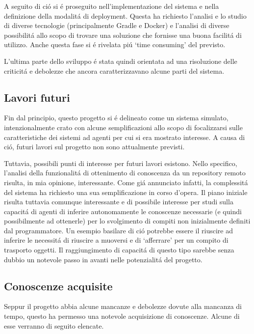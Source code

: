 A seguito di ci\'o si \'e proseguito nell'implementazione del sistema e nella definizione della modalit\'a di deployment. Questa ha richiesto l'analisi e lo studio di diverse tecnologie (principalmente Gradle e Docker) e l'analisi di diverse possibilit\'a allo scopo di trovare una soluzione che fornisse una buona facilit\'a di utilizzo. Anche questa fase si \'e rivelata pi\'u `time consuming' del previsto.

L'ultima parte dello sviluppo \'e stata quindi orientata ad una risoluzione delle criticit\'a e debolezze che ancora caratterizzavano alcune parti del sistema.

\subsection{Lavori futuri}

Fin dal principio, questo progetto si \'e delineato come un sistema simulato, intenzionalmente crato con alcune semplificazioni allo scopo di focalizzarsi sulle caratteristiche dei sistemi ad agenti per cui si era mostrato interesse. A causa di ci\'o, futuri lavori sul progetto non sono attualmente previsti.

\parag
Tuttavia, possibili punti di interesse per futuri lavori esistono. Nello specifico, l'analisi della funzionalit\'a di ottenimento di conoscenza da un repository remoto risulta, in mia opinione, interessante. Come gi\'a annunciato infatti, la complessit\'a del sistema ha richiesto una sua semplificazione in corso d'opera. Il piano iniziale risulta tuttavia comunque interessante e di possibile interesse per studi sulla capacit\'a di agenti di inferire autonomamente le conoscenze necessarie (e quindi possibilmente ad ottenerle) per lo svolgimento di compiti non inizialmente definiti dal programmatore. Un esempio basilare di ci\'o potrebbe essere il riuscire ad inferire le necessit\'a di riuscire a muoversi e di `afferrare' per un compito di trasporto oggetti. Il raggiungimento di capacit\'a di questo tipo sarebbe senza dubbio un notevole passo in avanti nelle potenzialit\'a del progetto.

\subsection{Conoscenze acquisite}

Seppur il progetto abbia alcune mancanze e debolezze dovute alla mancanza di tempo, questo ha permesso una notevole acquisizione di conoscenze. Alcune di esse verranno di seguito elencate.

